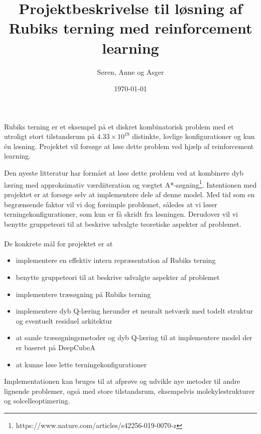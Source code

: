 \documentclass[12pt,fleqn,]{article}
\title{Projektbeskrivelse til løsning af Rubiks terning med reinforcement learning}
\author{Søren, Anne og Asger}
\date{\today}
\begin{document}
\maketitle
\noindent
Rubiks terning er et eksempel på et diskret kombinatorisk problem med et utroligt stort tilstandsrum på $4.33\times 10^{19}$ distinkte, lovlige konfigurationer og kun én løsning. 
Projektet vil forsøge at løse dette problem ved hjælp af reinforcement learning. 

Den nyeste litteratur har formået at løse dette problem ved at kombinere dyb læring med approksimativ værdiiteration og vægtet A*-søgning\footnote{https://www.nature.com/articles/s42256-019-0070-z}.
Intentionen med projektet er at forsøge selv at implementere dele af denne model. 
Med tid som en begrænsende faktor vil vi dog forsimple problemet, således at vi løser terningekonfigurationer, som kun er få skridt fra løsningen.
Derudover vil vi benytte gruppeteori til at beskrive udvalgte teoretiske aspekter af problemet.
\\\\
De konkrete mål for projektet er at
\begin{itemize}
	\item implementere en effektiv intern repræsentation af Rubiks terning
	\item benytte gruppeteori til at beskrive udvalgte aspekter af problemet
	\item implementere træsøgning på Rubiks terning
	\item implementere dyb Q-læring herunder et neuralt netværk med todelt struktur og eventuelt residuel arkitektur
	\item at samle træsøgningsmetoder og dyb Q-læring til at implementere model der er baseret på DeepCubeA 
	\item at kunne løse lette terningekonfigurationer
\end{itemize}
Implementationen kan bruges til at afprøve og udvikle nye metoder til andre lignende problemer, også med store tilstandsrum, eksempelvis molekylestrukturer og solcelleoptimering. 



 
\end{document}
